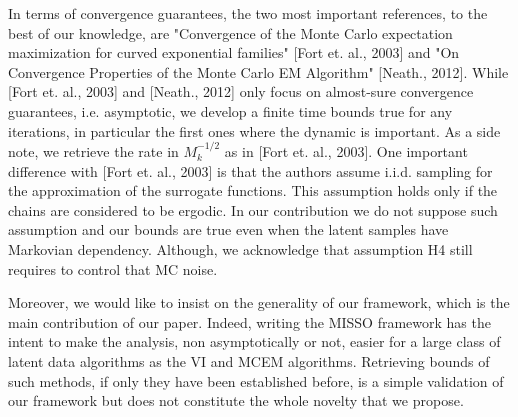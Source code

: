 \documentclass[wcp]{jmlr}
\begin{document}
In terms of convergence guarantees, the two most important references, to the best of our knowledge, are "Convergence of the Monte Carlo expectation maximization for curved exponential families" [Fort et. al.,  2003] and "On Convergence Properties of the Monte Carlo EM Algorithm" [Neath.,  2012]. While [Fort et. al.,  2003] and [Neath.,  2012] only focus on almost-sure convergence guarantees, i.e. asymptotic, we develop a finite time bounds true for any iterations, in particular the first ones where the dynamic is important.
As a side note, we retrieve the rate in $M_k^{-1/2}$ as in [Fort et. al.,  2003].
One important difference with [Fort et. al.,  2003] is that the authors assume i.i.d. sampling for the approximation of the surrogate functions. This assumption holds only if the chains are considered to be ergodic. In our contribution we do not suppose such assumption and our bounds are true even when the latent samples have Markovian dependency.
Although, we acknowledge that assumption H4 still requires to control that MC noise.


Moreover, we would like to insist on the generality of our framework, which is the main contribution of our paper. Indeed, writing the MISSO framework has the intent to make the analysis, non asymptotically or not, easier for a large class of latent data algorithms as the VI and MCEM algorithms. Retrieving bounds of such methods, if only they have been established before, is a simple validation of our framework but does not constitute the whole novelty that we propose.
\end{document}
